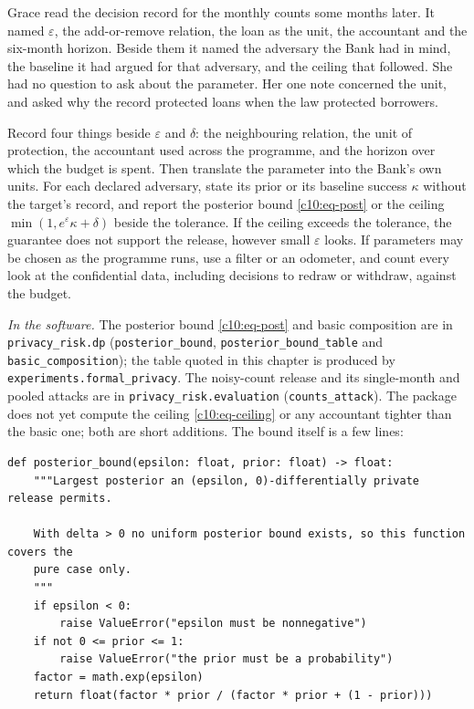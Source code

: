 Grace read the decision record for the monthly counts some months later. It named
$\varepsilon$, the add-or-remove relation, the loan as the unit, the accountant and
the six-month horizon. Beside them it named the adversary the Bank had in mind, the
baseline it had argued for that adversary, and the ceiling that followed. She had
no question to ask about the parameter. Her one note concerned the unit, and asked
why the record protected loans when the law protected borrowers.

\begin{inpractice}
Record four things beside $\varepsilon$ and $\delta$: the neighbouring relation,
the unit of protection, the accountant used across the programme, and the horizon
over which the budget is spent. Then translate the parameter into the Bank's own
units. For each declared adversary, state its prior or its baseline success
$\kappa$ without the target's record, and report the posterior bound
\eqref{c10:eq-post} or the ceiling $\min(1, e^\varepsilon\kappa + \delta)$ beside
the tolerance. If the ceiling exceeds the tolerance, the guarantee does not support
the release, however small $\varepsilon$ looks. If parameters may be chosen as the
programme runs, use a filter or an odometer, and count every look at the
confidential data, including decisions to redraw or withdraw, against the budget.

\sloppy\smallskip\noindent\textit{In the software.} The posterior bound
\eqref{c10:eq-post} and basic composition are in \texttt{privacy\_risk.dp}
(\texttt{posterior\_bound}, \texttt{posterior\_bound\_table} and
\texttt{basic\_composition}); the table quoted in this chapter is produced by
\texttt{experiments.formal\_privacy}. The noisy-count release and its single-month
and pooled attacks are in \texttt{privacy\_risk.evaluation}
(\texttt{counts\_attack}). The package does not yet compute the ceiling
\eqref{c10:eq-ceiling} or any accountant tighter than the basic one; both are
short additions. The bound itself is a few lines:
\begin{lstlisting}
def posterior_bound(epsilon: float, prior: float) -> float:
    """Largest posterior an (epsilon, 0)-differentially private release permits.

    With delta > 0 no uniform posterior bound exists, so this function covers the
    pure case only.
    """
    if epsilon < 0:
        raise ValueError("epsilon must be nonnegative")
    if not 0 <= prior <= 1:
        raise ValueError("the prior must be a probability")
    factor = math.exp(epsilon)
    return float(factor * prior / (factor * prior + (1 - prior)))
\end{lstlisting}
\end{inpractice}

